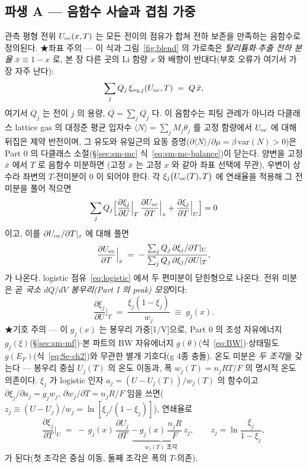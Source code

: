 \subsection{파생 A --- 음함수 사슬과 겹침 가중}\label{ssec:overlap}
관측 평형 전위 $U_{\mathrm{oc}}(x,T)$ 는 모든 전이의 점유가 합쳐 전하 보존을 만족하는 음함수로 정의된다. ★좌표 주의
--- 이 식과 그림~\ref{fig:blend} 의 가로축은 \emph{탈리튬화$\cdot$추출 전하 분율} $\bar x\equiv1-x$ 로, 본 장
다른 곳의 Li 함량 $x$ 와 배향이 반대다(부호 오류가 여기서 가장 자주 난다):
\begin{equation}
\sum_j Q_j\,\xi_{\mathrm{eq},j}(U_{\mathrm{oc}},T) \;=\; Q\,\bar x,
\label{eq:implicit}
\end{equation}
여기서 $Q_j$ 는 전이 $j$ 의 용량, $Q=\sum_j Q_j$ 다. 이 음함수는 피팅 관례가 아니라 다클래스 lattice gas 의
대정준 평균 입자수 $\langle N\rangle=\sum_jM_j\theta_j$ 를 고정 함량에서 $U_{\mathrm{oc}}$ 에 대해 뒤집은 제약
반전이며, 그 유도와 유일근의 요동 증명($\partial\langle N\rangle/\partial\mu=\beta\,\mathrm{var}(N)>0$)은
Part 0 의 다클래스 소절(\S\ref{sec:sm-mc} 식~\eqref{eq:sm-mc-balance})이 닫는다. 양변을 고정 $\bar x$ 에서 $T$ 로 음함수 미분하면
(고정 $\bar x$ 는 고정 $x$ 와 같아 좌표 선택에 무관), 우변이 상수라 좌변의 $T$-전미분이 $0$ 이 되어야
한다. 각 $\xi_j\bigl(U_{\mathrm{oc}}(T),T\bigr)$ 에 연쇄율을 적용해 그 전미분을 풀어 적으면
\[
\sum_j Q_j\Big[\frac{\partial\xi_j}{\partial U}\Big|_T\,\frac{\partial U_{\mathrm{oc}}}{\partial T}\Big|_x
+\frac{\partial\xi_j}{\partial T}\Big|_U\Big]=0
\]
이고, 이를 $\partial U_{\mathrm{oc}}/\partial T|_x$ 에 대해 풀면
\begin{equation}
\frac{\partial U_{\mathrm{oc}}}{\partial T}\Big|_x
\;=\; -\,\frac{\sum_j Q_j\,\partial\xi_j/\partial T|_U}{\sum_j Q_j\,\partial\xi_j/\partial U|_T},
\label{eq:implicit_diff}
\end{equation}
가 나온다. logistic 점유~\eqref{eq:logistic} 에서 두 편미분이 닫힌형으로 나온다. 전위 미분은 곧 \emph{국소
$dQ/dV$ 봉우리(Part I 의 peak) 모양}이다:
\begin{equation}
\frac{\partial\xi_j}{\partial U}\Big|_T \;=\; \frac{\xi_j(1-\xi_j)}{w_j} \;\equiv\; g_j(x).
\label{eq:gj}
\end{equation}
★기호 주의 --- 이 $g_j(x)$ 는 봉우리 가중[1/V]으로, Part 0 의 조성 자유에너지 $g_j(\xi)$(\S\ref{sec:sm-mf})$\cdot$본 파트의
BW 자유에너지 $g(\theta)$(식~\eqref{eq:BW})$\cdot$상태밀도 $g(E_F)$(식~\eqref{eq:Se-ch2})와 무관한 별개
기호다(g 4종 충돌). 온도 미분은 \emph{두 조각}을 갖는다 --- 봉우리 중심 $U_j(T)$ 의 온도 이동과,
폭 $w_j(T)=n_jRT/F$ 의 명시적 온도 의존이다. $\xi_j$ 가 logistic 인자 $a_j=(U-U_j(T))/w_j(T)$ 의 함수이고
$\partial\xi_j/\partial a_j=g_j w_j$, $\partial w_j/\partial T=n_jR/F$ 임을 쓰면($z_j\equiv(U-U_j)/w_j=\ln[\xi_j/
(1-\xi_j)]$), 연쇄율로
\begin{equation}
\frac{\partial\xi_j}{\partial T}\Big|_U
\;=\; -\,g_j(x)\,\frac{\partial U_j}{\partial T}
\;\underbrace{-\,g_j(x)\,\frac{n_jR}{F}\,z_j}_{w_j(T)\text{ 조각}},
\qquad z_j=\ln\frac{\xi_j}{1-\xi_j},
\label{eq:dxidT}
\end{equation}
가 된다(첫 조각은 중심 이동, 둘째 조각은 폭의 $T$-의존).

